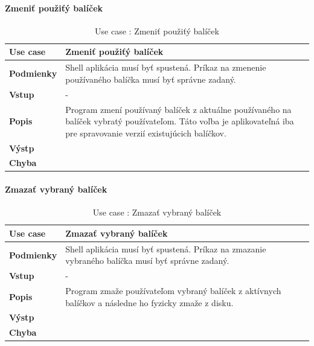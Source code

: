 \paragraph{Zmeniť  použiťý balíček}
\begin{center}
	\begin{table}[htbp]
		\begin{tabular}{|p{2.5cm}|p{14cm}|}
			\hline
			\textbf{Use case} & Zmeniť  použiťý balíček \\ 
			\hline
			\textbf{Podmienky} & Shell aplikácia musí byť spustená. Príkaz na zmenenie používaného balíčka musí byť správne zadaný.\\ 
			\hline
			\textbf{Vstup} & -\\
			\hline
			\textbf{Popis} & Program zmení používaný balíček z aktuálne používaného na balíček vybratý používateľom. Táto voľba je aplikovateľná iba pre spravovanie verzií existujúcich balíčkov. \\ 
			\hline
			\textbf{Výstp} & \\
			\hline
			\textbf{Chyba} & \\
			\hline
		\end{tabular}
		\label{table:1}
		\caption{Use case : Zmeniť  použiťý balíček}
	\end{table}
\end{center}
\newpage
\paragraph{Zmazať vybraný balíček}
\begin{center}
	\begin{table}[htbp]
		\begin{tabular}{|p{2.5cm}|p{14cm}|}
			\hline
			\textbf{Use case} & Zmazať vybraný balíček \\ 
			\hline
			\textbf{Podmienky} & Shell aplikácia musí byť spustená. Príkaz na zmazanie vybraného balíčka musí byť správne zadaný.\\ 
			\hline
			\textbf{Vstup} & -\\
			\hline
			\textbf{Popis} & Program zmaže používateľom vybraný balíček z aktívnych balíčkov a následne ho fyzicky zmaže z disku. \\
			\hline
			\textbf{Výstp} & \\
			\hline
			\textbf{Chyba} & \\
			\hline
		\end{tabular}
		\label{table:1}
		\caption{Use case : Zmazať vybraný balíček}
	\end{table}
\end{center}
